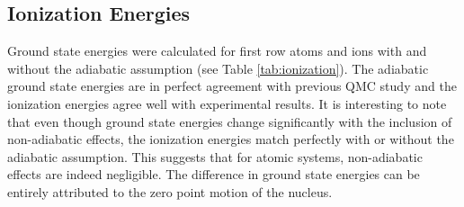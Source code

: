 \documentclass[aps,prl,superscriptaddress,groupedaddress]{revtex4}
\begin{document}
\subsection{Ionization Energies}
Ground state energies were calculated for first row atoms and ions with and without the adiabatic assumption (see Table \ref{tab:ionization}). The adiabatic ground state energies are in perfect agreement with previous QMC study \cite{Seth_Bench} and the ionization energies agree well with experimental results. It is interesting to note that even though ground state energies change significantly with the inclusion of non-adiabatic effects, the ionization energies match perfectly with or without the adiabatic assumption. This suggests that for atomic systems, non-adiabatic effects are indeed negligible. The difference in ground state energies can be entirely attributed to the zero point motion of the nucleus. 
\end{document}
